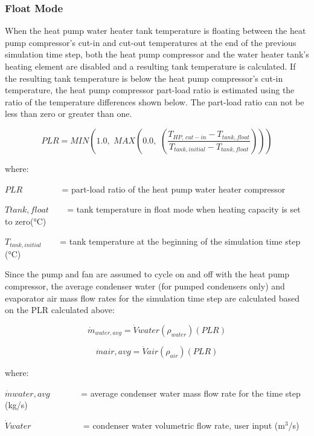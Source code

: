 \subsubsection{Float Mode}\label{float-mode-000}

When the heat pump water heater tank temperature is floating between the heat pump compressor's cut-in and cut-out temperatures at the end of the previous simulation time step, both the heat pump compressor and the water heater tank's heating element are disabled and a resulting tank temperature is calculated. If the resulting tank temperature is below the heat pump compressor's cut-in temperature, the heat pump compressor part-load ratio is estimated using the ratio of the temperature differences shown below. The part-load ratio can not be less than zero or greater than one.

\begin{equation}
PLR = MIN\left( {1.0,\,\,MAX\left( {0.0,\,\,\left( {\frac{{{T_{HP,\,cut - in}} - {T_{tank,float}}}}{{{T_{tank,initial}} - {T_{tank,float}}}}} \right)} \right)} \right)
\end{equation}

where:

\(PLR\) ~~~~~~~~ = part-load ratio of the heat pump water heater compressor

\(Ttank,float\) ~~~ = tank temperature in float mode when heating capacity is set to zero(°C)

\({T_{tank,initial}}\) ~~~ = tank temperature at the beginning of the simulation time step (°C)

Since the pump and fan are assumed to cycle on and off with the heat pump compressor, the average condenser water (for pumped condensers only) and evaporator air mass flow rates for the simulation time step are calculated based on the PLR calculated above:

\begin{equation}
{\dot m_{water,avg}} = \dot Vwater\left( {{\rho_{water}}} \right)\left( {PLR} \right)
\end{equation}

\begin{equation}
\dot mair,avg = \dot Vair\left( {{\rho_{air}}} \right)\left( {PLR} \right)
\end{equation}

where:

\(\dot mwater,avg\) ~~~~~~ = average condenser water mass flow rate for the time step (kg/s)

\(\dot Vwater\) ~~~~~~~~~~~ = condenser water volumetric flow rate, user input (m\(^{3}\)/s)


